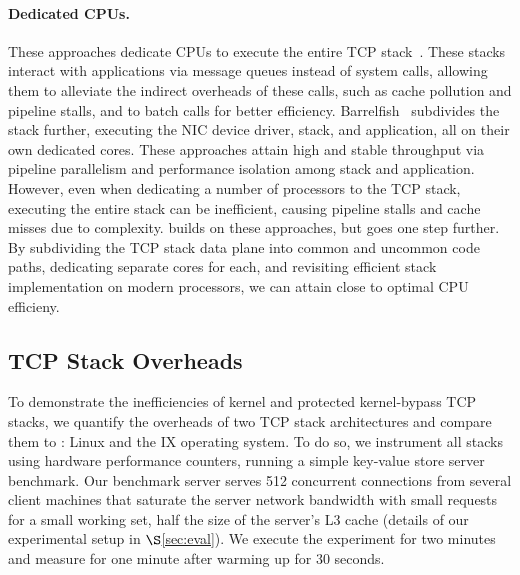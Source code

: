 \paragraph{Dedicated CPUs.} These approaches dedicate CPUs to execute
the entire TCP stack~\cite{onload, flexsc}. These stacks interact with
applications via message queues instead of system calls, allowing them
to alleviate the indirect overheads of these calls, such as cache
pollution and pipeline stalls, and to batch calls for better
efficiency. Barrelfish~\cite{barrelfish} subdivides the stack further,
executing the NIC device driver, stack, and application, all on their
own dedicated cores. These approaches attain high and stable
throughput via pipeline parallelism and performance isolation among
stack and application. However, even when dedicating a number of
processors to the TCP stack, executing the entire stack can be
inefficient, causing pipeline stalls and cache misses due to
complexity. \taas builds on these approaches, but goes one step
further. By subdividing the TCP stack data plane into common and
uncommon code paths, dedicating separate cores for each, and
revisiting efficient stack implementation on modern processors, we can
attain close to optimal CPU efficieny.

\subsection{TCP Stack Overheads}\label{sec:linux_overheads}

To demonstrate the inefficiencies of kernel and protected
kernel-bypass TCP stacks, we quantify the overheads of two TCP stack
architectures and compare them to \taas: Linux and the IX operating
system. To do so, we instrument all stacks using hardware performance
counters, running a simple key-value store server benchmark. Our
benchmark server serves 512 concurrent connections from several client
machines that saturate the server network bandwidth with small
requests for a small working set, half the size of the server's L3
cache (details of our experimental setup in $\S$\ref{sec:eval}). We
execute the experiment for two minutes and measure for one minute
after warming up for 30 seconds.


